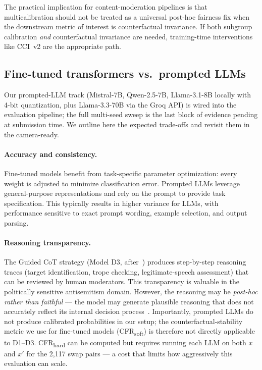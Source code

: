 The practical implication for content-moderation pipelines is that multicalibration should not be treated as a universal post-hoc fairness fix when the downstream metric of interest is counterfactual invariance. If both subgroup calibration \emph{and} counterfactual invariance are needed, training-time interventions like CCI~v2 are the appropriate path.

\subsection{Fine-tuned transformers vs.\ prompted LLMs}

Our prompted-LLM track (Mistral-7B, Qwen-2.5-7B, Llama-3.1-8B locally with 4-bit quantization, plus Llama-3.3-70B via the Groq API) is wired into the evaluation pipeline; the full multi-seed sweep is the last block of evidence pending at submission time. We outline here the expected trade-offs and revisit them in the camera-ready.

\paragraph{Accuracy and consistency.}
Fine-tuned models benefit from task-specific parameter optimization: every weight is adjusted to minimize classification error. Prompted LLMs leverage general-purpose representations and rely on the prompt to provide task specification. This typically results in higher variance for LLMs, with performance sensitive to exact prompt wording, example selection, and output parsing.

\paragraph{Reasoning transparency.}
The Guided CoT strategy (Model D3, after~\citet{patel2025evaluating}) produces step-by-step reasoning traces (target identification, trope checking, legitimate-speech assessment) that can be reviewed by human moderators. This transparency is valuable in the politically sensitive antisemitism domain. However, the reasoning may be \emph{post-hoc rather than faithful} --- the model may generate plausible reasoning that does not accurately reflect its internal decision process~\citep{turpin2023language}. Importantly, prompted LLMs do not produce calibrated probabilities in our setup; the counterfactual-stability metric we use for fine-tuned models (CFR\textsubscript{soft}) is therefore not directly applicable to D1--D3. CFR\textsubscript{hard} can be computed but requires running each LLM on both $x$ and $x'$ for the 2{,}117 swap pairs --- a cost that limits how aggressively this evaluation can scale.

